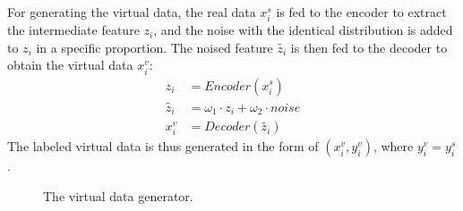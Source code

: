 \documentclass[journal]{IEEEtran}
\begin{document}
For generating the virtual data, the real data $x _{i}^{s}$ is fed to the encoder to extract the intermediate feature $z_i$, and the noise with the identical distribution is added to $z_i$ in a specific proportion. The noised feature ${\tilde{z_i}}$ is then fed to the decoder to obtain the virtual data $x_{i}^{v}$: 
\begin{equation}
\begin{split}
		z_i	&=  Encoder(x_{i}^{s})	\\
		\tilde{z_i} &= \omega_{1} \cdot z_i + \omega_{2} \cdot noise \\
    x_{i}^{v} &= Decoder(\tilde{z_i})
\end{split}
\end{equation}
The labeled virtual data is thus generated in the form of $(x_{i}^{v}, y_{i}^{v})$, where $y_{i}^{v} =y_{i}^{s}$.

\begin{figure*}
    \centering
		\hspace{1cm}
\caption{The virtual data generator.}
\label{FigVirtualDataGenerator}
\end{figure*}
\end{document}
